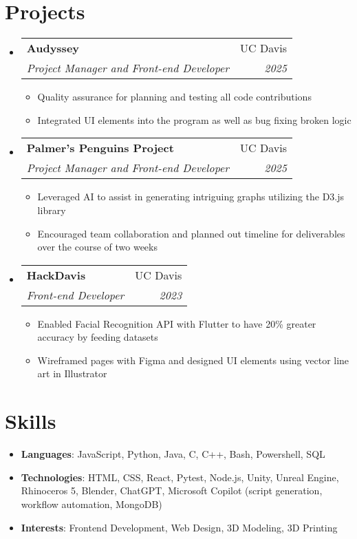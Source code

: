 \documentclass[letterpaper,11pt]{article}
\makeatletter
\newcommand{\resumeSubheading}[4]{
  \vspace{-1pt}\item
    \begin{tabular*}{0.97\textwidth}[t]{l@{\extracolsep{\fill}}r}
      \textbf{#1} & #2 \\
      \textit{\small#3} & \textit{\small #4} \\
    \end{tabular*}\vspace{-5pt}
}
\newcommand{\resumeSubHeadingListStart}{\begin{itemize}[leftmargin=*]}
\newcommand{\resumeSubHeadingListEnd}{\end{itemize}}
\newcommand{\resumeItemListStart}{\begin{itemize}}
\newcommand{\resumeItemListEnd}{\end{itemize}\vspace{-5pt}}
\makeatother
\begin{document}
\section{Projects}
\resumeSubHeadingListStart
    \resumeSubheading
        {Audyssey}{UC Davis}
        {Project Manager and Front-end Developer}{2025}
        \resumeItemListStart
            \begin{itemize}
                \item Quality assurance for planning and testing all code contributions
                \item Integrated UI elements into the program as well as bug fixing broken logic
            \end{itemize}
        \resumeItemListEnd
    \resumeSubheading
        {Palmer's Penguins Project}{UC Davis}
        {Project Manager and Front-end Developer}{2025}
        \resumeItemListStart
            \begin{itemize}
                \item Leveraged AI to assist in generating intriguing graphs utilizing the D3.js library
                \item Encouraged team collaboration and planned out timeline for deliverables over the course of two weeks
            \end{itemize}
        \resumeItemListEnd
    \resumeSubheading
        {HackDavis}{UC Davis}
        {Front-end Developer}{2023}
        \resumeItemListStart
            \begin{itemize}
                \item Enabled Facial Recognition API with Flutter to have 20\% greater accuracy by feeding datasets
                \item Wireframed pages with Figma and designed UI elements using vector line art in Illustrator
            \end{itemize}
        \resumeItemListEnd
\resumeSubHeadingListEnd

%
\section{Skills}
    \resumeSubHeadingListStart
        \item{
            \textbf{Languages}{: JavaScript, Python, Java, C, C++, Bash, Powershell, SQL}
        }
        \item{
            \textbf{Technologies}{: HTML, CSS, React, Pytest, Node.js, Unity, Unreal Engine, Rhinoceros 5, Blender, ChatGPT, Microsoft Copilot (script generation, workflow automation, MongoDB)}
        }
        \item{
            \textbf{Interests}{: Frontend Development, Web Design, 3D Modeling, 3D Printing}
        }
    \resumeSubHeadingListEnd

\end{document}
